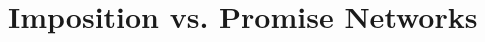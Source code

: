\documentclass[../OAE-SPEC-MAIN.tex]{subfiles}
\begin{document}










\section{Imposition vs. Promise Networks}
\end{document}
